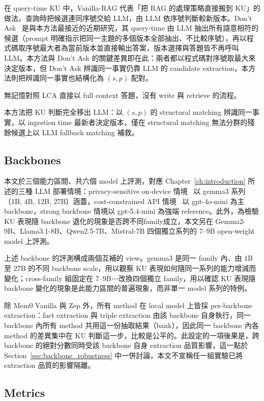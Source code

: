 在 query-time KU 中，Vanilla-RAG 代表「把 RAG 的處理策略直接搬到 KU」的做法，查詢時把候選連同序號交給 LLM，由 LLM 依序號判斷較新版本。Don't Ask~\cite{reddy2026don} 是與本方法最接近的近期研究，其 query-time 由 LLM 抽出所有語意相符的候選（prompt 明確指示把同一主題的多個版本全部抽出、不比較序號），再以程式碼取序號最大者為當前版本並直接輸出答案，版本選擇與答題皆不再呼叫 LLM。本方法與 Don't Ask 的關鍵差異即在此：兩者都以程式碼對序號取最大來決定版本，但 Don't Ask 辨識同一事實仍靠 LLM 的 candidate extraction，本方法則把辨識同一事實也結構化為 $(s, p)$ 配對。
 
無記憶對照 LCA 直接以 full context 答題，沒有 write 與 retrieve 的流程。
 
本方法把 KU 判斷完全移出 LLM：以 $(s, p)$ 的 structural matching 辨識同一事實，以 ingestion time 最新者決定版本，僅在 structural matching 無法分群的殘餘候選上以 LLM fallback matching 補救。
 
\subsection{Backbones}
\label{subsec:backbones}
 
本文於三個能力區間、共六個 model 上評測，對應 Chapter~\ref{ch:introduction} 所述的三種 LLM 部署情境：privacy-sensitive on-device 情境~\cite{pham2025slimlm} 以 gemma3 系列（1B, 4B, 12B, 27B）涵蓋，cost-constrained API 情境~\cite{chenfrugalgpt} 以 gpt-4o-mini 為主 backbone，strong backbone 情境以 gpt-5.4-mini 為強端 reference。此外，為檢驗 KU 表現隨 backbone 退化的現象是否跨不同family成立，本文另在 Gemma2-9B、Llama3.1-8B、Qwen2.5-7B、Mistral-7B 四個獨立系列的 7--9B open-weight model 上評測。
 
上述 backbone 的評測構成兩個互補的 view。gemma3 是同一 family 內、由 1B 至 27B 的不同 backbone scale，用以觀察 KU 表現如何隨同一系列的能力增減而變化；cross-family 組固定在 7--9B⋯改換四個獨立 family，用以確認 KU 表現隨 backbone 變化的現象是此能力區間的普遍現象，而非單一 model 系列的特例。
 
除 Mem0 Vanilla 與 Zep 外，所有 method 在 local model 上皆採 per-backbone extraction：fact extraction 與 triple extraction 由該 backbone 自身執行，同一 backbone 內所有 method 共用這一份抽取結果（bank），因此同一 backbone 內各 method 的差異集中在 KU 判斷這一步，比較是公平的。此設定的一項後果是，跨 backbone 的絕對分數同時受該 backbone 自身 extraction 品質影響，這一點於 Section~\ref{sec:backbone_robustness} 中一併討論，本文不宣稱任一組實驗已將 extraction 品質的影響隔離。
 
\subsection{Metrics}
\label{subsec:metrics}
 
